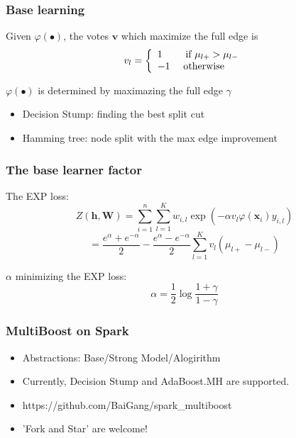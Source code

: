 \documentclass{beamer}
\begin{document}
\begin{frame}
\frametitle{Base learning}
\begin{block}{Given $\varphi(\bullet)$, the votes $\mathbf{v}$}
which maximize the full edge is
\[v_l = \left\{
  \begin{array}{l l}
  1 \quad \quad \text{   if } \mu_{l+} > \mu_{l-} \\
  -1 \quad \text{ otherwise }
  \end{array} \right. \]
\end{block}
\begin{block}{$\varphi(\bullet)$ is determined by maximazing the full edge $\gamma$}
\begin{itemize}
\item Decision Stump: finding the best split cut
\item Hamming tree: node split with the max edge improvement
\end{itemize}
\end{block}
\end{frame}

\begin{frame}
\frametitle{The base learner factor}
\begin{block}{The EXP loss:}
$$Z(\mathbf{h}, \mathbf{W}) = \sum_{i=1}^{n} \sum_{l=1}^{K} w_{i,l} \exp(-\alpha v_l \varphi(\mathbf{x}_i) y_{i,l}) $$
$$= \frac{e^\alpha + e^{-\alpha}}{2} - \frac{e^\alpha - e^{-\alpha}}{2} \sum_{l=1}^{K} v_l(\mu_{l+} - \mu_{l-})$$
\end{block}
\begin{block}{$\alpha$ minimizing the EXP loss:}
$$\alpha = \frac{1}{2} \log \frac{1+\gamma}{1-\gamma}$$
\end{block}
\end{frame}


\begin{frame}
\frametitle{MultiBoost on Spark}
\begin{itemize}
\item Abstractions: Base/Strong Model/Alogirithm
\item Currently, Decision Stump and AdaBoost.MH are supported.
\item https://github.com/BaiGang/spark\_multiboost
\item 'Fork and Star' are welcome!
\end{itemize}
\end{frame}
\end{document}
